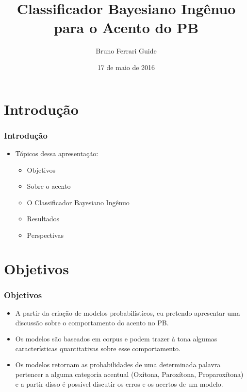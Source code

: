 \documentclass[xcolor=table]{beamer}
\author{Bruno Ferrari Guide}
\title{Classificador Bayesiano Ingênuo para o Acento do PB}
\institute{Orientador: Marcelo Barra Ferreira\\ Departamento de Linguística - FFLCH - USP}
\date{17 de maio de 2016}
\begin{document}
	\maketitle
	\section{Introdução}
	\begin{frame}
		\frametitle{Introdução}
		\begin{itemize}
			\item Tópicos dessa apresentação:\\
			\begin{itemize}
				\item Objetivos\\
				\item Sobre o acento\\
				\item O Classificador Bayesiano Ingênuo\\
				\item Resultados\\
				\item Perspectivas\\
			\end{itemize}
		\end{itemize}
	\end{frame}


	\section{Objetivos}
	\begin{frame}
		\frametitle{Objetivos}
		\begin{itemize}
			\item A partir da criação de modelos probabilísticos, eu pretendo apresentar uma discussão sobre o comportamento do acento no PB.\\
			\item Os modelos são baseados em corpus e podem trazer à tona algumas características quantitativas sobre esse comportamento.\\
			\item Os modelos retornam as probabilidades de uma determinada palavra pertencer a alguma categoria acentual (Oxítona, Paroxítona, Proparoxítona) e a partir disso é possível discutir os erros e os acertos de um modelo.\\
		\end{itemize}
	\end{frame}
\end{document}
